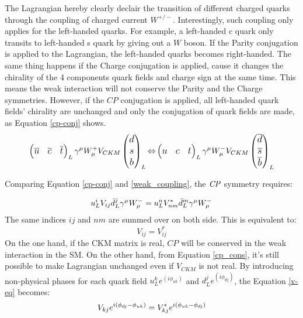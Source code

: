 The Lagrangian hereby clearly declair the transition of different charged quarks through the coupling of charged current $W^{+/-}$. Interestingly, such coupling only applies for the left-handed quarks. For example, a left-handed c quark only transits to left-handed s quark by giving out a $W$ boson. If the Parity conjugation is applied to the Lagrangian, the left-handed quarks becomes right-handed. The same thing happens if the Charge conjugation is applied, cause it changes the chirality of the 4 components quark fields and charge sign at the same time. This means the weak interaction will not conserve the Parity and the Charge symmetries. However, if the $CP$ conjugation is applied, all left-handed quark fields' chirality are  unchanged and only the conjugation of quark fields are made, as Equation \ref{cp-conj} shows.
\begin{equation}\label{cp-conj}
\small
\large
\begin{pmatrix}
\overline{u}&\overline{c}&\overline{t}
\end{pmatrix}_L
\gamma^\mu W^{+}_{\mu}
V_{CKM}
\begin{pmatrix}
d\\s\\b\\
\end{pmatrix}_L
{\Leftrightarrow}
\begin{pmatrix}
{u}&{c}&{t}
\end{pmatrix}_L
\gamma^\mu W^{-}_{\mu}
{V_{CKM}}
\begin{pmatrix}
\overline d\\\overline s\\\overline b\\
\end{pmatrix}_L
\end{equation} 

Comparing  Equation \ref{cp-conj} and \ref{weak_coupling}, the $\it{CP}$ symmetry requires: 

\begin{equation}\label{cp_cons}
\large
{u_{L}^i}V_{ij} \bar{d}^{j}_L \gamma^\mu W^{-}_{\mu}
=
{{u}^{n}_LV^{*}_{nm}\bar{d}_{L}^m}  \gamma^\mu W^{-}_{\mu}
\end{equation}
The same indices $ij$ and $nm$ are summed over on both side. This is equivalent to: 
\begin{equation}\label{v-eq}
V_{ij} = V^{*}_{ij}
\end{equation}
On the one hand, if the CKM matrix is real, $CP$ will be conserved in the weak interaction in the SM. On the other hand, from Equation \ref{cp_cons}, it's still possible to make Lagrangian unchanged even if $V_{CKM}$ is not real. By introducing non-physical phases for each quark field $u^k_L e^{(i\phi_{uk})}$ and $d^j_L e^{(i\phi_{dj})}$, the Equation \ref{v-eq} becomes:
\begin{equation}
\Large
V_{kj} e^{i(\phi_{dj}-\phi_{uk})} = V^{*}_{kj}e^{i(\phi_{uk}-\phi_{dj})}
\end{equation}

